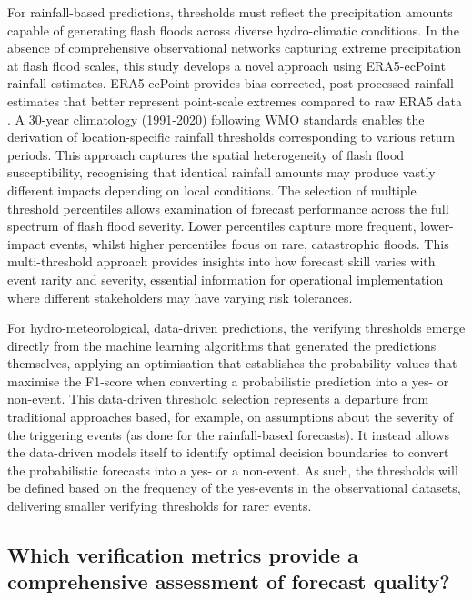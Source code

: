 For rainfall-based predictions, thresholds must reflect the precipitation amounts capable of generating flash floods across diverse hydro-climatic conditions. In the absence of comprehensive observational networks capturing extreme precipitation at flash flood scales, this study develops a novel approach using ERA5-ecPoint rainfall estimates. ERA5-ecPoint provides bias-corrected, post-processed rainfall estimates that better represent point-scale extremes compared to raw ERA5 data \citep{Pillosu_2025a}. A 30-year climatology (1991-2020) following WMO standards enables the derivation of location-specific rainfall thresholds corresponding to various return periods. This approach captures the spatial heterogeneity of flash flood susceptibility, recognising that identical rainfall amounts may produce vastly different impacts depending on local conditions. The selection of multiple threshold percentiles allows examination of forecast performance across the full spectrum of flash flood severity. Lower percentiles capture more frequent, lower-impact events, whilst higher percentiles focus on rare, catastrophic floods. This multi-threshold approach provides insights into how forecast skill varies with event rarity and severity, essential information for operational implementation where different stakeholders may have varying risk tolerances.

For hydro-meteorological, data-driven predictions, the verifying thresholds emerge directly from the machine learning algorithms that generated the predictions themselves, applying an optimisation that establishes the probability values that maximise the F1-score when converting a probabilistic prediction into a yes- or non-event. This data-driven threshold selection represents a departure from traditional approaches based, for example, on assumptions about the severity of the triggering events (as done for the rainfall-based forecasts). It instead allows the data-driven models itself to identify optimal decision boundaries to convert the probabilistic forecasts into a yes- or a non-event. As such, the thresholds will be defined based on the frequency of the yes-events in the observational datasets, delivering smaller verifying thresholds for rarer events. 


\subsection{Which verification metrics provide a comprehensive assessment of forecast quality?}

